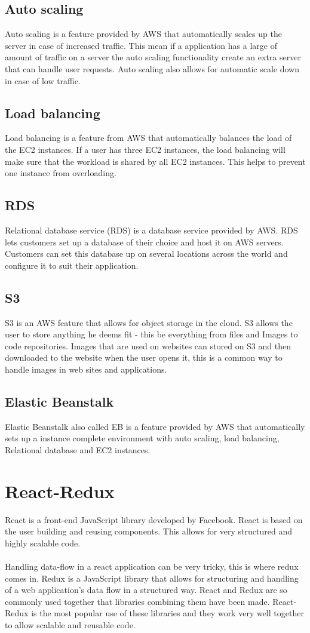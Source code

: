 \subsection{Auto scaling}
Auto scaling is a feature provided by AWS that automatically scales up the server in case of increased traffic. This mean if a application has a large of amount of traffic on a server the auto scaling functionality create an extra server  that can handle user requests. Auto scaling also allows for automatic scale down in case of low traffic. 
\subsection{Load balancing}
Load balancing is a feature from AWS that automatically balances the load of the EC2 instances. If a user has three EC2 instances, the load balancing will make sure that the workload is shared by all EC2 instances. This helps to prevent one instance from overloading.
\subsection{RDS}
Relational database service (RDS) is a database service provided by AWS. RDS lets customers set up a database of their choice and host it on AWS servers. Customers can set this database up on several locations across the world and configure it to suit their application.
\subsection{S3}
S3 is an AWS feature that allows for object storage in the cloud. S3 allows the user to store anything he deems fit - this be everything from files and Images to code repositories. Images that are used on websites can stored on S3 and then downloaded to the website when the user opens it, this is a common way to handle images in web sites and applications.
\subsection{Elastic Beanstalk}
Elastic Beanstalk also called EB is a feature provided by AWS that automatically sets up a instance complete environment with auto scaling, load balancing, Relational database and EC2 instances.
\section{React-Redux}
React is a front-end JavaScript library developed by Facebook. React is based on the user building and reusing components. This allows for very structured and highly scalable code.
\\\\
Handling data-flow in a react application can be very tricky, this is where redux comes in. Redux is a JavaScript library that allows for structuring and handling of a web application's data flow in a structured way. React and Redux are so commonly used together that libraries combining them have been made. React-Redux is the most popular use of these libraries and they work very well together to allow scalable and reusable code. 
